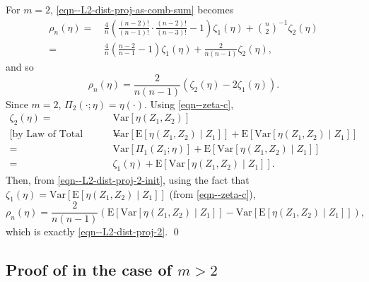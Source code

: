 \documentclass[12pt]{article}
\numberwithin{equation}{section}
\theoremstyle{definition}
\theoremstyle{plain}
\begin{document}
For \(m = 2\), \eqref{eqn--L2-dist-proj-as-comb-sum} becomes
\begin{align*}
  \rho_{n} (\eta) =
  & \, \frac{4}{n} \left( \frac{(n - 2)!}{(n - 1)!} \cdot \frac{(n - 2)!}{(n
  - 3)!} - 1 \right) \zeta_{1} (\eta) + \binom{n}{2}^{- 1} \zeta_{2} (\eta) \\
  =
  & \, \frac{4}{n} \left( \frac{n - 2}{n - 1} - 1 \right) \zeta_{1} (\eta)
  + \frac{2}{n (n - 1)} \zeta_{2} (\eta),
\end{align*}
and so
\begin{equation}
  \rho_{n} (\eta) =
  \frac{2}{n (n - 1)} \left( \zeta_{2} (\eta) - 2 \zeta_{1} (\eta) \right).
  \label{eqn--L2-dist-proj-2-init}
\end{equation}
Since \(m = 2\), \(\Pi_{2} \left( \cdot; \eta \right) = \eta (\cdot)\).
Using \eqref{eqn--zeta-c},
\begin{align*}
  \zeta_{2} (\eta) =
  & \, \mathrm{Var} \left[ \eta \left( Z_{1}, Z_{2} \right) \right] \\
  \text{[by Law of Total Variance]} \quad =
  & \, \mathrm{Var} \left[ \mathrm{E} \left[ \eta \left( Z_{1}, Z_{2} \right)
  \middle| Z_{1} \right] \right] + \mathrm{E} \left[ \mathrm{Var} \left[ \eta
  \left( Z_{1}, Z_{2} \right) \middle| Z_{1} \right] \right] \\
  =
  & \, \mathrm{Var} \left[ \Pi_{1} \left( Z_{1}; \eta \right) \right] +
  \mathrm{E} \left[ \mathrm{Var} \left[ \eta \left( Z_{1}, Z_{2} \right)
  \middle| Z_{1} \right] \right] \\
  =
  & \, \zeta_{1} (\eta) + \mathrm{E} \left[ \mathrm{Var} \left[ \eta \left(
  Z_{1}, Z_{2} \right) \middle| Z_{1} \right] \right].
\end{align*}
Then, from \eqref{eqn--L2-dist-proj-2-init}, using the fact that
\(\zeta_{1} (\eta) = \mathrm{Var} \left[ \mathrm{E} \left[ \eta \left( Z_{1},
Z_{2} \right) \middle| Z_{1} \right] \right]\) (from \eqref{eqn--zeta-c}),
\begin{equation*}
  \rho_{n} (\eta) = \frac{2}{n (n - 1)} \left( \mathrm{E} \left[
  \mathrm{Var} \left[ \eta \left( Z_{1}, Z_{2} \right) \middle| Z_{1} \right]
  \right] - \mathrm{Var} \left[ \mathrm{E} \left[ \eta \left( Z_{1}, Z_{2}
  \right) \middle| Z_{1} \right] \right] \right),
\end{equation*}
which is exactly \eqref{eqn--L2-dist-proj-2}.
\qed

\subsection{Proof of \texorpdfstring{}{Theorem
\ref{thm--L2-dist-proj}} in the case of \texorpdfstring{\(m > 2\)}{m > 2}}
\end{document}
